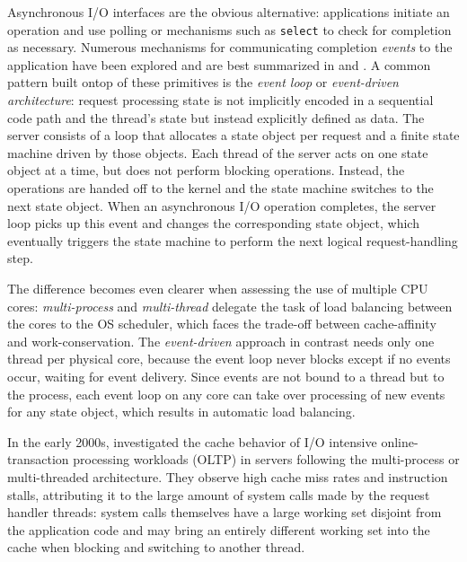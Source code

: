 \documentclass[12pt,a4paper]{book}
\begin{document}
Asynchronous I/O interfaces are the obvious alternative:
applications initiate an operation and use polling or mechanisms such as \texttt{select} to check for completion as necessary.
Numerous mechanisms for communicating completion \emph{events} to the application have been explored and are best summarized in \cite{c10k} and \cite{seda}.
A common pattern built ontop of these primitives is the \emph{event loop} or \emph{event-driven architecture}:
request processing state is not implicitly encoded in a sequential code path and the thread's state but instead explicitly defined as data.
The server consists of a loop that allocates a state object per request and a finite state machine driven by those objects.
Each thread of the server acts on one state object at a time, but does not perform blocking operations.
Instead, the operations are handed off to the kernel and the state machine switches to the next state object.
When an asynchronous I/O operation completes, the server loop picks up this event and changes the corresponding state object, which eventually triggers the state machine to perform the next logical request-handling step.~\cite{flashwebsrv,seda}

The difference becomes even clearer when assessing the use of multiple CPU cores:
\emph{multi-process} and \emph{multi-thread} delegate the task of load balancing between the cores to the OS scheduler, which faces the trade-off between cache-affinity and work-conservation.
The \emph{event-driven} approach in contrast needs only one thread per physical core, because the event loop never blocks except if no events occur, waiting for event delivery.
Since events are not bound to a thread but to the process, each event loop on any core can take over processing of new events for any state object, which results in automatic load balancing.

In the early 2000s, \citeauthor*{cohort} investigated the cache behavior of I/O intensive online-transaction processing workloads (OLTP) in servers following the multi-process or multi-threaded architecture.
They observe high cache miss rates and instruction stalls, attributing it to the large amount of system calls made by the request handler threads:
system calls themselves have a large working set disjoint from the application code and may bring an entirely different working set into the cache when blocking and switching to another thread.
\end{document}
